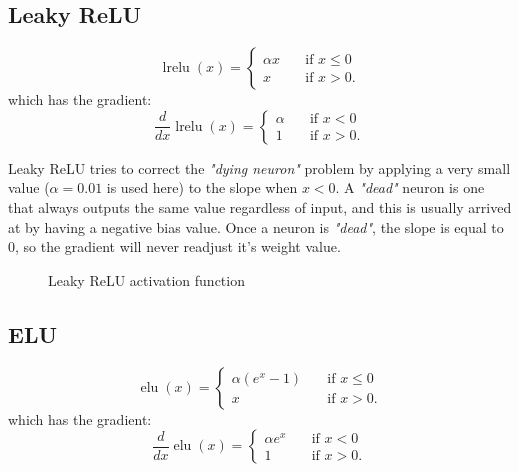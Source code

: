\documentclass{article}
\DeclareMathOperator{\lrelu}{lrelu}
\DeclareMathOperator{\elu}{elu}
\begin{document}
\subsection{Leaky ReLU}\label{sec:lrelu}
\begin{equation}
  \lrelu(x) = 
    \begin{cases}
     \alpha x & \quad \text{if } x \leq  0 \\
      x       & \quad \text{if } x > 0 .
    \end{cases}
\end{equation} 
which has the gradient:
\begin{equation}
  \frac{d}{dx} \lrelu(x) =
     \begin{cases} 
      \alpha     & \quad \text{if } x < 0 \\
        1        & \quad \text{if } x > 0 .
    \end{cases} 
\end{equation}

Leaky ReLU tries to correct the \textit{"dying neuron"} problem by applying a very small value ($\alpha = 0.01$ is used here) to the slope when $x < 0$. A \textit{"dead"} neuron is one that always outputs the same value regardless of input, and this is usually arrived at by having a negative bias value. Once a neuron is \textit{"dead"}, the slope is equal to 0, so the gradient will never readjust it's weight value. 

\begin{figure}[H]
    \centering
    \begin{subfigure}{}
      
    \end{subfigure}
    \begin{subfigure}{}
      
    \end{subfigure}
    \caption{Leaky ReLU activation function}
\end{figure}

\subsection{ELU}\label{sec:elu}
\begin{equation}
  \elu(x) = 
    \begin{cases}
     \alpha (e^{x} - 1) & \quad \text{if } x \leq  0 \\
     x          & \quad \text{if } x > 0 .
    \end{cases}
\end{equation} 
which has the gradient:
\begin{equation}
  \frac{d}{dx} \elu(x) =
     \begin{cases} 
      \alpha e^{x}      & \quad \text{if } x < 0 \\
      1      & \quad \text{if } x > 0 .
    \end{cases} 
\end{equation}
\end{document}
